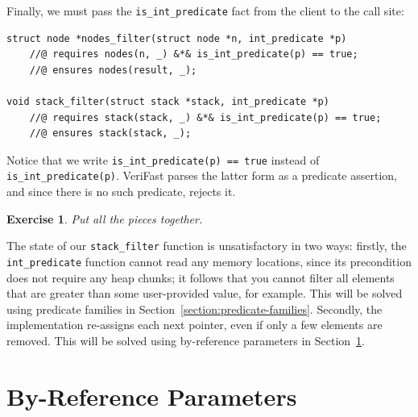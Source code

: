 \documentclass{article}
\newtheorem{exercise}{Exercise}
\begin{document}
Finally, we must pass the \lstinline!is_int_predicate! fact
from the client to the call site:
\begin{lstlisting}
struct node *nodes_filter(struct node *n, int_predicate *p)
    //@ requires nodes(n, _) &*& is_int_predicate(p) == true;
    //@ ensures nodes(result, _);

void stack_filter(struct stack *stack, int_predicate *p)
    //@ requires stack(stack, _) &*& is_int_predicate(p) == true;
    //@ ensures stack(stack, _);
\end{lstlisting}
Notice that we write \lstinline!is_int_predicate(p) == true!
instead of \lstinline!is_int_predicate(p)!. VeriFast parses the
latter form as a predicate assertion, and since there is no
such predicate, rejects it.

\begin{exercise}\label{exercise:filter}
Put all the pieces together.
\end{exercise}

The state of our \lstinline!stack_filter! function is
unsatisfactory in two ways: firstly, the
\lstinline!int_predicate! function cannot read any memory
locations, since its precondition does not require any heap
chunks; it follows that you cannot filter all elements that are
greater than some user-provided value, for example. This will
be solved using predicate families in
Section~\ref{section:predicate-families}. Secondly, the
implementation re-assigns each next pointer, even if only a few
elements are removed. This will be solved using by-reference
parameters in Section~\ref{section:byref-params}.

\section{By-Reference Parameters}\label{section:byref-params}
\end{document}
